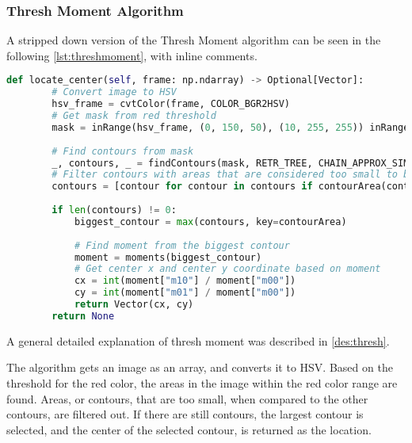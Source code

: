 \subsubsection{Thresh Moment Algorithm}\label{solution:thresh_moment}
A stripped down version of the Thresh Moment algorithm can be seen in the following \autoref{lst:threshmoment}, with inline comments.

\begin{lstlisting}[language=Python,label={lst:threshmoment},caption={Stripped down version of thresh moment from thresh\_moment.py}]
	def locate_center(self, frame: np.ndarray) -> Optional[Vector]:
	    # Convert image to HSV
	    hsv_frame = cvtColor(frame, COLOR_BGR2HSV)
	    # Get mask from red threshold
	    mask = inRange(hsv_frame, (0, 150, 50), (10, 255, 255)) inRange(hsv_frame, (170, 150, 50), (180, 255, 255))
	    
	    # Find contours from mask
	    _, contours, _ = findContours(mask, RETR_TREE, CHAIN_APPROX_SIMPLE)
	    # Filter contours with areas that are considered too small to be the target
	    contours = [contour for contour in contours if contourArea(contour) > 20]
	    
	    if len(contours) != 0:
		    biggest_contour = max(contours, key=contourArea)
		    
		    # Find moment from the biggest contour
		    moment = moments(biggest_contour)
		    # Get center x and center y coordinate based on moment
		    cx = int(moment["m10"] / moment["m00"])
		    cy = int(moment["m01"] / moment["m00"])
		    return Vector(cx, cy)
	    return None
\end{lstlisting}

A general detailed explanation of thresh moment was described in \autoref{des:thresh}.

The algorithm gets an image as an array, and converts it to HSV.
Based on the threshold for the red color, the areas in the image within the red color range are found. 
Areas, or contours, that are too small, when compared to the other contours, are filtered out.
If there are still contours, the largest contour is selected, and the center of the selected contour, is returned as the location.